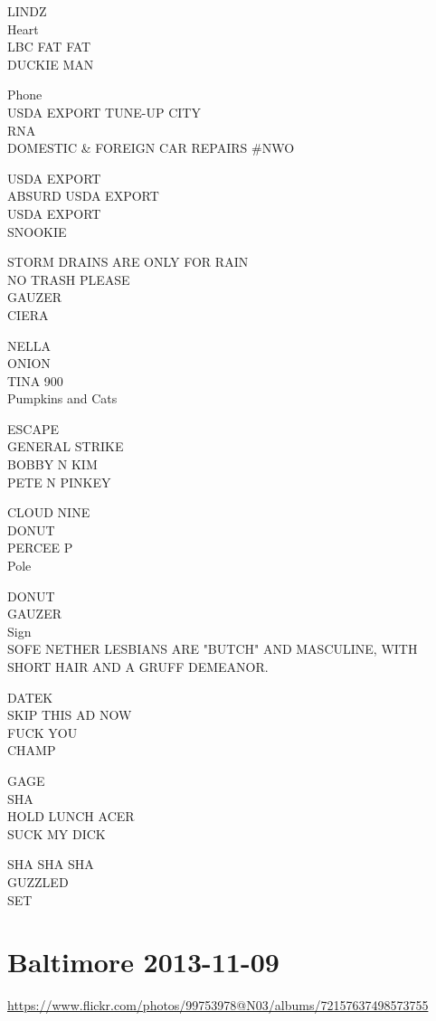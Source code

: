 \documentclass[10pt,letterpaper]{article}
\begin{document}
LINDZ\\
Heart\\
LBC FAT FAT\\
DUCKIE MAN

Phone\\
USDA EXPORT TUNE{-}UP CITY\\
RNA\\
DOMESTIC \& FOREIGN CAR REPAIRS \#NWO

USDA EXPORT\\
ABSURD USDA EXPORT\\
USDA EXPORT\\
SNOOKIE

STORM DRAINS ARE ONLY FOR RAIN\\
NO TRASH PLEASE\\
GAUZER\\
CIERA

NELLA\\
ONION\\
TINA 900\\
Pumpkins and Cats

ESCAPE\\
GENERAL STRIKE\\
BOBBY N KIM\\
PETE N PINKEY

CLOUD NINE\\
DONUT\\
PERCEE P\\
Pole

DONUT\\
GAUZER\\
Sign\\
SOFE NETHER LESBIANS ARE "BUTCH" AND MASCULINE, WITH SHORT HAIR AND A GRUFF DEMEANOR.

DATEK\\
SKIP THIS AD NOW\\
FUCK YOU\\
CHAMP

GAGE\\
SHA\\
HOLD LUNCH ACER\\
SUCK MY DICK

SHA SHA SHA\\
GUZZLED\\
SET


\section*{Baltimore 2013-11-09}

\url{https://www.flickr.com/photos/99753978@N03/albums/72157637498573755}
\end{document}
